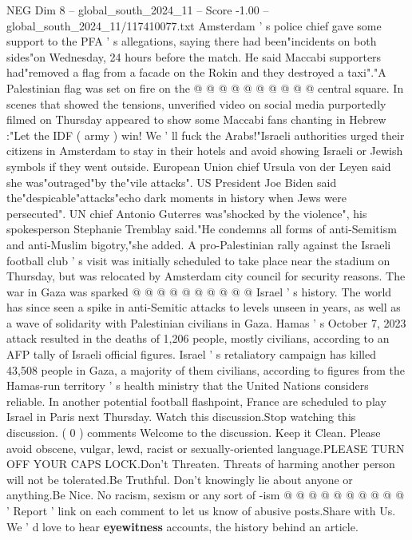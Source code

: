 \begin{textsample}{NEG Dim 8 – global\_south\_2024\_11 – Score -1.00 – global\_south\_2024\_11/117410077.txt}
Amsterdam ' s police chief gave some support to the PFA ' s allegations, saying there had been"incidents on both sides"on Wednesday, 24 hours before the match.
He said Maccabi supporters had"removed a flag from a facade on the Rokin and they destroyed a taxi"."A Palestinian flag was set on fire on the @ @ @ @ @ @ @ @ @ @ central square.
In scenes that showed the tensions, unverified video on social media purportedly filmed on Thursday appeared to show some Maccabi fans chanting in Hebrew :"Let the IDF ( army ) win!
We ' ll fuck the Arabs!"Israeli authorities urged their citizens in Amsterdam to stay in their hotels and avoid showing Israeli or Jewish symbols if they went outside.
European Union chief Ursula von der Leyen said she was"outraged"by the"vile attacks".
US President Joe Biden said the"despicable"attacks"echo dark moments in history when Jews were persecuted".
UN chief Antonio Guterres was"shocked by the violence", his spokesperson Stephanie Tremblay said."He condemns all forms of anti-Semitism and anti-Muslim bigotry,"she added.
A pro-Palestinian rally against the Israeli football club ' s visit was initially scheduled to take place near the stadium on Thursday, but was relocated by Amsterdam city council for security reasons.
The war in Gaza was sparked @ @ @ @ @ @ @ @ @ @ Israel ' s history.
The world has since seen a spike in anti-Semitic attacks to levels unseen in years, as well as a wave of solidarity with Palestinian civilians in Gaza.
Hamas ' s October 7, 2023 attack resulted in the deaths of 1,206 people, mostly civilians, according to an AFP tally of Israeli official figures.
Israel ' s retaliatory campaign has killed 43,508 people in Gaza, a majority of them civilians, according to figures from the Hamas-run territory ' s health ministry that the United Nations considers reliable.
In another potential football flashpoint, France are scheduled to play Israel in Paris next Thursday.
Watch this discussion.Stop watching this discussion. ( 0 ) comments Welcome to the discussion.
Keep it Clean.
Please avoid obscene, vulgar, lewd, racist or sexually-oriented language.PLEASE TURN OFF YOUR CAPS LOCK.Don't Threaten.
Threats of harming another person will not be tolerated.Be Truthful.
Don't knowingly lie about anyone or anything.Be Nice.
No racism, sexism or any sort of -ism @ @ @ @ @ @ @ @ @ @ ' Report ' link on each comment to let us know of abusive posts.Share with Us.
We ' d love to hear \textbf{eyewitness} accounts, the history behind an article.

\end{textsample}

